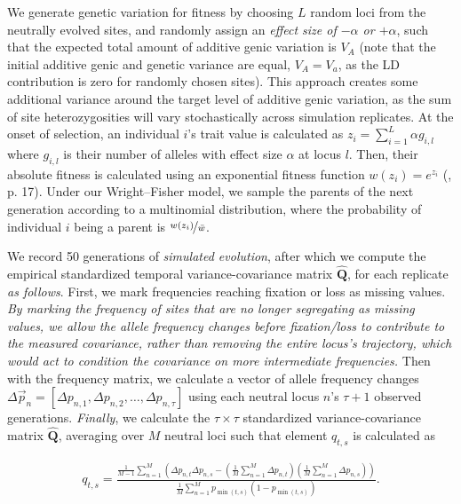 \documentclass[11pt]{article}
\newcommand{\vb}[1]{{\it \color{blue} #1}}
\newcommand{\E}{\mathbb{E}}
\DeclareMathOperator{\cov}{Cov}
\begin{document}
We generate genetic variation for fitness by choosing $L$ random loci from the
neutrally evolved sites, and randomly assign an \vb{effect size of $-\alpha$ or
$+\alpha$}, such that the expected total amount of additive genic variation is
$V_A$ (note that the initial additive genic and genetic variance are equal,
$V_A = V_a$, as the LD contribution is zero for randomly chosen sites).  This
approach creates some additional variance around the target level of additive
genic variation, as the sum of site heterozygosities will vary stochastically
across simulation replicates. At the onset of selection, an individual $i$'s
trait value is calculated as $z_i = \sum_{i=1}^L \alpha g_{i,l}$ where
$g_{i,l}$ is their number of alleles with effect size $\alpha$ at locus $l$.
Then, their absolute fitness is calculated using an exponential fitness
function $w(z_i) = e^{z_i}$ (\cite{Turelli1990-kd}, p. 17). Under our
Wright--Fisher model, we sample the parents of the next generation according to
a multinomial distribution, where the probability of individual $i$ being a
parent is $\nicefrac{w(z_i)}{\bar{w}}$. 

We record 50 generations of \vb{simulated evolution}, after which we compute the
empirical standardized temporal variance-covariance matrix
$\widehat{\mathbf{Q}}$, for each replicate \vb{as follows}. First, we mark
frequencies reaching fixation or loss as missing values. \vb{By marking the
  frequency of sites that are no longer segregating as missing values, we allow
  the allele frequency changes before fixation/loss to contribute to the
  measured covariance, rather than removing the entire locus's trajectory,
which would act to condition the covariance on more intermediate frequencies.}
Then with the frequency matrix, we calculate a vector of allele frequency
changes $\Delta \vec{p}_n = [\Delta p_{n,1}, \Delta p_{n,2}, \ldots, \Delta
p_{n,\tau}]$ using each neutral locus $n$'s $\tau+1$ observed generations.
\vb{Finally}, we calculate the $\tau \times \tau$ standardized
variance-covariance matrix $\widehat{\mathbf{Q}}$, averaging over $M$ neutral
loci such that element $q_{t,s}$ is calculated as

\begin{align}
  q_{t,s} = \frac{\frac{1}{M - 1} \sum_{n=1}^M \left( \Delta p_{n,t} \Delta p_{n,s} - \left(\frac{1}{M} \sum_{n=1}^M \Delta p_{n,t}\right) \left( \frac{1}{M} \sum_{n=1}^M \Delta p_{n,s} \right) \right)}{
  \frac{1}{M} \sum_{n=1}^M p_{\min(t,s)} \left(1 - p_{\min(t,s)}\right)
  }.
  \label{eq:ave-temp-autocov}
\end{align}
%
\end{document}
